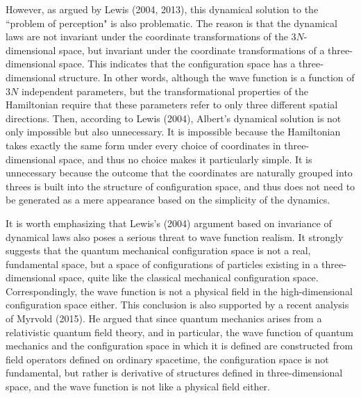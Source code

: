 However, as argued by Lewis (2004, 2013), this dynamical solution to the ``problem of perception" is also problematic.
The reason is that the dynamical laws are not invariant under the coordinate transformations of the $3N$-dimensional space, but  invariant under the coordinate transformations of a three-dimensional space. 
This indicates that the configuration space has a three-dimensional  structure. In other words, although the wave function is a function of $3N$ independent parameters, but the transformational properties of the Hamiltonian require that these parameters refer to only three different spatial directions. 
Then, according to Lewis (2004), Albert's dynamical solution is not only impossible but also unnecessary. It is impossible because the Hamiltonian takes exactly the same form under every choice of coordinates in three-dimensional space, and thus no choice makes it particularly simple. It is unnecessary because the outcome that the coordinates are naturally grouped into threes is built into the structure of configuration space, and thus does not need to be generated as a mere appearance based on the simplicity of the dynamics.

It is worth emphasizing that Lewis's (2004) argument based on invariance of dynamical laws also poses a serious threat to wave function realism. It strongly suggests that the quantum mechanical configuration space is not a real, fundamental space, but a space of configurations of particles existing in a three-dimensional space, quite like the classical mechanical configuration space. Correspondingly, the wave function is not a physical field in the high-dimensional configuration space either. This conclusion is also supported by a recent analysis of Myrvold (2015). He argued that since quantum mechanics arises from a relativistic quantum field theory, and in particular, the wave function of quantum mechanics and the configuration space in which it is defined are constructed from field operators defined on ordinary spacetime,
the configuration space is not fundamental, but rather is derivative of structures defined in three-dimensional space, and the wave function is not like a physical field either. 

